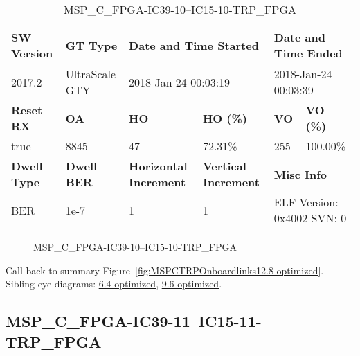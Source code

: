 \begin{table}[h]
\centering
\caption{MSP\_C\_FPGA-IC39-10--IC15-10-TRP\_FPGA}
\label{tab:MSPCFPGAIC3910IC1510TRPFPGA12.8-optimized}
\begin{tabular}{@{}|l|l|l|l|l|l|@{}}
\toprule
\textbf{SW Version}                & \textbf{GT Type}   & \multicolumn{2}{l|}{\textbf{Date and Time Started}}            & \multicolumn{2}{l|}{\textbf{Date and Time Ended}}        \\ \midrule
2017.2                       & UltraScale GTY          & \multicolumn{2}{l|}{2018-Jan-24 00:03:19}                   & \multicolumn{2}{l|}{2018-Jan-24 00:03:39}               \\ \midrule
\textbf{Reset RX}                  & \textbf{OA} & \textbf{HO}   & \textbf{HO (\%)} & \textbf{VO} & \textbf{VO (\%)} \\ \midrule
true & 8845        & 47          & 72.31\%        & 255        & 100.00\%       \\ \midrule
\textbf{Dwell Type}                & \textbf{Dwell BER} & \textbf{Horizontal Increment} & \textbf{Vertical Increment}    & \multicolumn{2}{l|}{\textbf{Misc Info}}                  \\ \midrule
BER                            & 1e-7        & 1        & 1           & \multicolumn{2}{l|}{ELF Version: 0x4002 SVN: 0}                         \\ \bottomrule
\end{tabular}
\end{table}

\begin{figure}[h]
\caption{MSP\_C\_FPGA-IC39-10--IC15-10-TRP\_FPGA} \label{fig:MSPCFPGAIC3910IC1510TRPFPGA12.8-optimized}
\end{figure}

Call back to summary Figure~\ref{fig:MSPCTRPOnboardlinks12.8-optimized}.
Sibling eye diagrams: \hyperref[sec:MSPCFPGAIC3910IC1510TRPFPGA6.4-optimized]{6.4-optimized}, \hyperref[sec:MSPCFPGAIC3910IC1510TRPFPGA9.6-optimized]{9.6-optimized}.

\clearpage
\newpage


\subsection{MSP\_C\_FPGA-IC39-11--IC15-11-TRP\_FPGA}\label{sec:MSPCFPGAIC3911IC1511TRPFPGA12.8-optimized}

